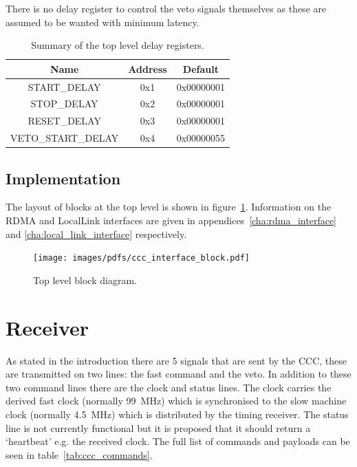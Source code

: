     There is no delay register to control the veto signals themselves as these are assumed to be wanted with minimum latency.
    
    \begin{table}
        \begin{center}
            \begin{tabular}{c | c | c }
                Name               & Address & Default    \\
                \hline
                START\_DELAY       & 0x1     & 0x00000001 \\
                STOP\_DELAY        & 0x2     & 0x00000001 \\
                RESET\_DELAY       & 0x3     & 0x00000001 \\
                VETO\_START\_DELAY & 0x4     & 0x00000055 \\
            \end{tabular}
        \end{center}
        \caption{Summary of the top level delay registers.}
        \label{tab:delay_regs}
    \end{table}
    \section{Implementation} %
    \label{sub:top_implementation}
    The layout of blocks at the top level is shown in figure~\ref{fig:ccc_interface_block}. Information on the RDMA and LocalLink interfaces are given in appendices~\ref{cha:rdma_interface} and \ref{cha:local_link_interface} respectively.
    
    \begin{figure}[htbp]
        \centering
            \texttt{[image: images/pdfs/ccc\_interface\_block.pdf]}
        \caption{Top level block diagram.}
        \label{fig:ccc_interface_block}
    \end{figure}
    
    \chapter{Receiver} %
    \label{cha:receiver}
    As stated in the introduction there are 5 signals that are sent by the CCC, these are transmitted on two lines: the fast command and the veto. In addition to these two command lines there are the clock and status lines. The clock carries the derived fast clock (normally 99~MHz) which is synchronised to the slow machine clock (normally 4.5~MHz) which is distributed by the timing receiver. The status line is not currently functional but it is proposed that it should return a `heartbeat' e.g. the received clock. The full list of commands and payloads can be seen in table~\ref{tab:ccc_commands}.
  
